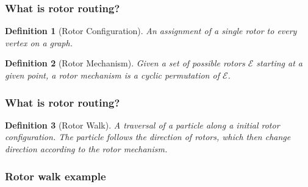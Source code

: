 \documentclass{beamer}
\newtheorem{defn}{Definition}
\begin{document}
\begin{frame}
	\frametitle{What is rotor routing?}
	
	\begin{defn}[Rotor Configuration]
		An assignment of a single rotor to every vertex on a graph.
	\end{defn}
	


\pause	

	\begin{defn}[Rotor Mechanism]
    		Given a set of possible rotors $\mathcal{E}$ starting at a given point, a rotor mechanism is a cyclic permutation of $\mathcal{E}$.
	\end{defn}
	

\pause
	\frametitle{What is rotor routing?}
	
	\begin{defn}[Rotor Walk]
		A traversal of a particle along a initial rotor configuration. The particle follows the direction of rotors, which then change direction according to the rotor mechanism.
    	\end{defn}

\end{frame}


\begin{frame}
	\frametitle{Rotor walk example}
	
	\begin{figure}
	\end{figure}
	
\end{frame}
\end{document}
